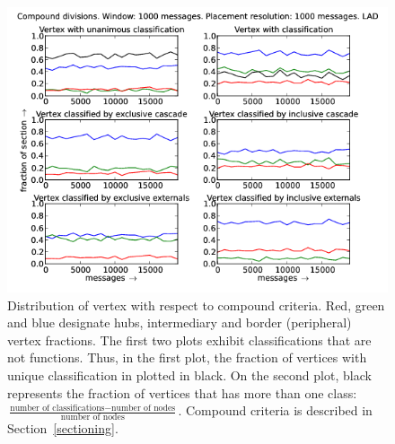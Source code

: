 \documentclass[%
 aip,
 jmp,%
 amsmath,amssymb,
 reprint,%
]{revtex4-1}
\begin{document}
\begin{figure}[hbtp] 
   \centering
        \includegraphics[width=\textwidth]{figs/LAD/1000_2}
    \caption{Distribution of vertex with respect to compound criteria. Red, green and blue designate hubs, intermediary and border (peripheral) vertex fractions. The first two plots exhibit classifications that are not functions. Thus, in the first plot, the fraction of vertices with unique classification in plotted in black. On the second plot, black represents the fraction of vertices that has more than one class: $\frac{\text{number of classifications} - \text{number of nodes}}{\text{number of nodes}}$. Compound criteria is described in Section~\ref{sectioning}.}
    \label{fig:lad1000_}
\end{figure}
\end{document}
